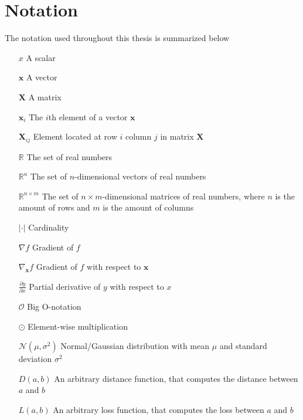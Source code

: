 \documentclass[./main.tex]{subfiles}
\begin{document}
\section*{Notation}
The notation used throughout this thesis is summarized below

\begin{itemize}[leftmargin=2.0cm,labelsep=0.5cm]
    \item[$x$] A scalar
    \item[$\bm{x}$] A vector
    \item[$\bm{X}$] A matrix
    \item[$\bm{x}_i$] The $i$th element of a vector $\bm{x}$ 
    \item[$\bm{X}_{ij}$] Element located at row $i$ column $j$ in matrix $\bm{X}$
    \item[$\mathbb{R}$] The set of real numbers
    \item[$\mathbb{R}^n$] The set of $n$-dimensional vectors of real numbers
    \item[$\mathbb{R}^{n \times m}$] The set of $n \times m$-dimensional matrices of real numbers, where $n$ is the amount of rows and $m$ is the amount of columns
    \item[$|\cdot|$] Cardinality
    \item[$\nabla f$] Gradient of $f$
    \item[$\nabla_{\bm{x}} f$] Gradient of $f$ with respect to $\bm{x}$ 
    \item[$\frac{\partial y}{\partial x}$] Partial derivative of $y$ with respect to $x$
    \item[$\mathcal{O}$] Big O-notation
    \item[$\odot$] Element-wise multiplication
    \item[$\mathcal{N} \left(\mu, \sigma^2 \right)$] Normal/Gaussian distribution with mean $\mu$ and standard deviation $\sigma^2$
    \item[$D(a, b)$] An arbitrary distance function, that computes the distance between $a$ and $b$
    \item[$L(a, b)$] An arbitrary loss function, that computes the loss between $a$ and $b$ 
\end{itemize}
\end{document}
